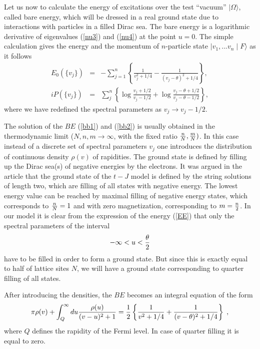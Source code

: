 \documentclass[a4paper,12pt]{article}
\newcommand{\nn}{\nonumber}
\begin{document}
Let us now to calculate the energy of excitations over the test ``vacuum''
$\mid\Omega\rangle$, called bare energy, which will be dressed
in a real ground state due to interactions with particles in a filled
Dirac sea. The bare energy is a logarithmic derivative of eigenvalues
(\ref{nu3}) and (\ref{nu4}) at the point $u=0$. The simple calculation
gives the energy and the momentum of $n$-particle state 
$\mid{v_1,...v_n}\mid{F}\rangle$ as it follows
\begin{eqnarray}
\label{EE}
E_0(\{v_j\})&=&-\sum_{j=1}^{n}\left\{\frac{1}{v_j^2 +1/4}-
\frac{1}{(v_j-\theta)^2 +1/4}\right\},\nn\\
iP(\{v_j\})&=&\sum_j^n\left\{\log\frac{v_j+1/2}{v_j -1/2}+
\log\frac{v_j-\theta+1/2}{v_j-\theta -1/2}\right\},
\end{eqnarray}
where we have redefined the spectral parameters as $v_j \rightarrow
v_j-1/2$.

The solution of the $BE$ (\ref{bb1}) and (\ref{bb2}) is usually obtained in 
the thermodynamic limit ($N,n,m \rightarrow \infty$, with the fixed ratio
${n \over N}, {m \over N})$. In this case instead of a discrete set of
spectral parameters $v_j$ one introduces the distribution of continuous 
density $\rho(v)$ of rapidities. The ground state is defined by filling
up the Dirac sea(s) of negative energies by the electrons. It was 
argued in the article \cite{BBO} that the ground state of the $t-J$ model
is defined by the string solutions of length two, which are filling of 
all states with negative energy. The lowest energy value can be reached
by maximal filling of negative energy states, which corresponds to
${n \over N}=1$ and with zero magnetization, corresponding to
$m={n \over 2}$. In our model it is clear from the expression
of the energy (\ref{EE}) that only the spectral parameters of the
interval
\begin{equation}
\label{uu}
-\infty < u < {\theta \over 2}
\end{equation}
have to be filled in order to form a ground state. But since this is
exactly equal to half of lattice sites $N$, we will have a ground 
state corresponding to quarter filling of all states.

After introducing the densities, the $BE$ becomes an integral
equation of the form \cite{BBO}
\begin{eqnarray}
\label{TBA1}
\pi \rho(v)+ \int_Q^{\infty}du \frac{\rho(u)}{(v-u)^2+1}=
{1 \over 2}\left\{\frac{1}{v^2 +1/4}+
\frac{1}{(v-\theta)^2 +1/4}\right\} \;, 
\end{eqnarray}
where $Q$ defines the rapidity of the Fermi level. In case of
quarter filling it is equal to zero.
\end{document}
